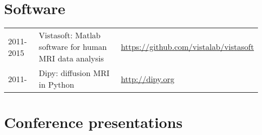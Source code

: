 \documentclass[11pt,fullpage]{article}
\begin{document}
\section*{Software}
\begin{longtable}{p{0.7in}|p{3.5in}|p{2in}}

2011-2015 & Vistasoft: Matlab software for human MRI data analysis & \url{https://github.com/vistalab/vistasoft}\\
2011- & Dipy: diffusion MRI in Python& \url{http://dipy.org}\\

\end{longtable}


\section*{Conference presentations}
\end{document}
